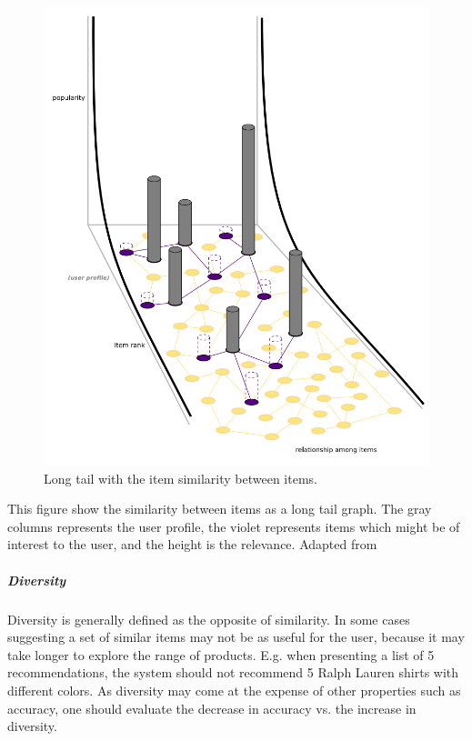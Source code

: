 \begin{figure}[H]
    \centering
    \includegraphics[scale=0.4]{image/longtailNoveltyFig.png}
    \caption{Long tail with the item similarity between items. }
    \label{figure:longtailNovelty}
\end{figure}


This figure show the similarity between items as a long tail graph. The gray
columns represents the user profile, the violet represents items which might be
of interest to the user, and the height is the relevance. Adapted
from~\cite{celma2008}

\subparagraph{Diversity}
Diversity is generally defined as the opposite of similarity. In some cases
suggesting a set of similar items may not be as useful for the user, because it
may take longer to explore the range of products. E.g. when presenting a list
of 5 recommendations, the system should not recommend 5 Ralph Lauren shirts
with different colors. As diversity may come at the expense of other properties
such as accuracy, one should evaluate the decrease in accuracy vs. the increase
in diversity.

